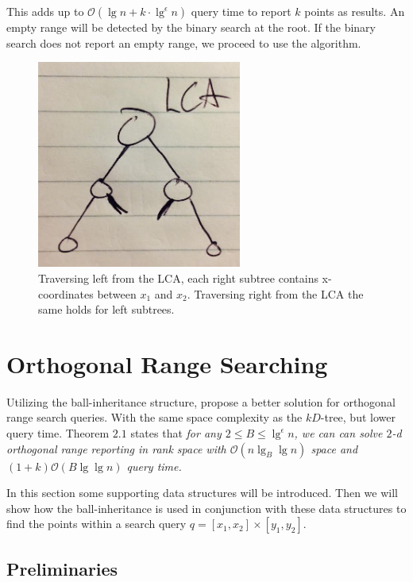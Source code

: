 This adds up to $\mathcal{O}(\lg n + k\cdot\lg^\epsilon n)$ query time to report $k$ points as results. An empty range will be detected by the binary search at the root. If the binary search does not report an empty range, we proceed to use the algorithm. \\

\begin{figure}[H]
    \centering
    \includegraphics[width=0.6\textwidth]{pictures/LCA.png}
    \caption{Traversing left from the LCA, each right subtree contains x-coordinates between $x_1$ and $x_2$. Traversing right from the LCA the same holds for left subtrees.}
    \label{fig:LCA}
\end{figure}


\section{Orthogonal Range Searching}
\label{sect:original}
Utilizing the ball-inheritance structure, \citeauthor{chanetal} propose a better solution for orthogonal range search queries. With the same space complexity as the $kD$-tree, but lower query time. Theorem $2.1$ states that \emph{for any $2 \leq B \leq \lg^\epsilon n$, we can can solve $2$-d orthogonal range reporting in rank space with $\mathcal{O}(n \lg_B \lg n)$ space and $(1+k)\mathcal{O}(B \lg \lg n)$ query time.}

In this section some supporting data structures will be introduced. Then we will show how the ball-inheritance is used in conjunction with these data structures to find the points within a search query $q = [x_1, x_2] \times [y_1, y_2]$.

\subsection{Preliminaries}

